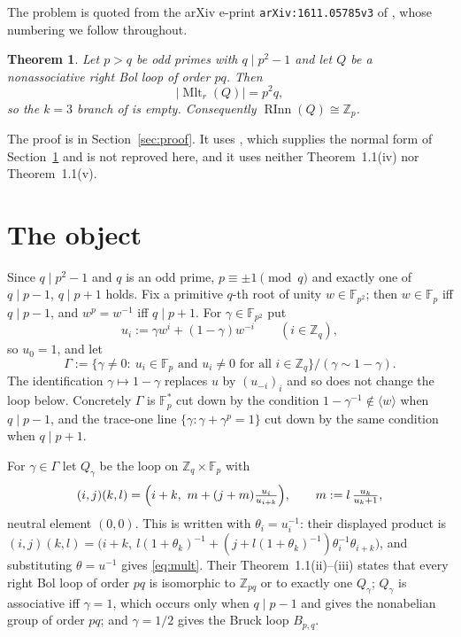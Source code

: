 \documentclass[11pt]{amsart}
\newtheorem{theorem}{Theorem}
\theoremstyle{definition}
\newcommand{\Mltr}{\operatorname{Mlt}_r}
\newcommand{\RInn}{\operatorname{RInn}}
\newcommand{\FF}[1]{\mathbb F_{#1}}
\newcommand{\Zq}{\mathbb Z_q}
\begin{document}
\noindent The problem is quoted from the arXiv e-print
\texttt{arXiv:1611.05785v3} of \cite{KNV}, whose numbering we follow throughout.

\begin{theorem}\label{thm:main}
Let $p>q$ be odd primes with $q\mid p^{2}-1$ and let $Q$ be a nonassociative
right Bol loop of order $pq$. Then
\[
  |\Mltr(Q)|=p^{2}q,
\]
so the $k=3$ branch of \cite[Theorem~1.1(iv)]{KNV} is empty. Consequently
$\RInn(Q)\cong\mathbb Z_p$.
\end{theorem}

The proof is in Section~\ref{sec:proof}. It uses
\cite[Theorem~1.1(ii)--(iii)]{KNV}, which supplies the normal form of
Section~\ref{sec:object} and is not reproved here, and it uses neither
Theorem~1.1(iv) nor Theorem~1.1(v).

\section{The object}\label{sec:object}

Since $q\mid p^{2}-1$ and $q$ is an odd prime, $p\equiv\pm1\pmod q$ and exactly
one of $q\mid p-1$, $q\mid p+1$ holds. Fix a primitive $q$-th root of unity
$w\in\FF{p^{2}}$; then $w\in\FF p$ iff $q\mid p-1$, and $w^{p}=w^{-1}$ iff
$q\mid p+1$. For $\gamma\in\FF{p^{2}}$ put
\begin{equation}\label{eq:u}
  u_i:=\gamma w^{i}+(1-\gamma)w^{-i}\qquad(i\in\Zq),
\end{equation}
so $u_0=1$, and let
\[
  \Gamma:=\bigl\{\gamma\neq0:\ u_i\in\FF p\text{ and }u_i\neq0
             \text{ for all }i\in\Zq\bigr\}\big/(\gamma\sim1-\gamma).
\]
The identification $\gamma\mapsto1-\gamma$ replaces $u$ by $(u_{-i})_i$ and so
does not change the loop below. Concretely $\Gamma$ is $\FF p^{*}$ cut down by
the condition $1-\gamma^{-1}\notin\langle w\rangle$ when $q\mid p-1$, and the
trace-one line $\{\gamma:\gamma+\gamma^{p}=1\}$ cut down by the same condition
when $q\mid p+1$.

For $\gamma\in\Gamma$ let $Q_\gamma$ be the loop on $\Zq\times\FF p$ with
\begin{equation}\label{eq:mult}
  (i,j)(k,l)=\Bigl(i+k,\ m+(j+m)\tfrac{u_i}{u_{i+k}}\Bigr),
  \qquad m:=l\,\tfrac{u_k}{u_k+1},
\end{equation}
neutral element $(0,0)$. This is \cite[Theorem~1.1(iii)]{KNV} written with
$\theta_i=u_i^{-1}$: their displayed product is
$(i,j)(k,l)=\bigl(i+k,\ l(1+\theta_k)^{-1}+(j+l(1+\theta_k)^{-1})
\theta_i^{-1}\theta_{i+k}\bigr)$, and substituting $\theta=u^{-1}$ gives
\eqref{eq:mult}. Their Theorem~1.1(ii)--(iii) states that every right Bol loop
of order $pq$ is isomorphic to $\mathbb Z_{pq}$ or to exactly one $Q_\gamma$;
$Q_\gamma$ is associative iff $\gamma=1$, which occurs only when $q\mid p-1$
and gives the nonabelian group of order $pq$; and $\gamma=1/2$ gives the Bruck
loop $B_{p,q}$.
\end{document}
